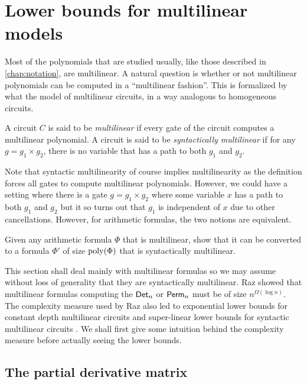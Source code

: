 \chapter{Lower bounds for multilinear models}\label{chap:multilinear}

Most of the polynomials that are studied usually, like those described in \autoref{chap:notation}, are multilinear. 
A natural question is whether or not multilinear polynomials can be computed in a ``multilinear fashion''. 
This is formalized by what the model of multilinear circuits, in a way analogous to homogeneous circuits. 

\begin{definition}
A circuit $C$ is said to be \emph{multilinear} if every gate of the circuit computes a multilinear polynomial. 
A circuit is said to be \emph{syntactically multilinear} if for any $g = g_1 \times g_2$, there is no variable that has a path to both $g_1$ and $g_2$. 
\end{definition}

Note that syntactic multilinearity of course implies multilinearity as the definition forces all gates to compute multilinear polynomials. 
However, we could have a setting where there is a gate $g = g_1 \times g_2$ where some variable $x$ has a path to both $g_1$ and $g_2$ but it so turns out that $g_1$ is independent of $x$ due to other cancellations. 
However, for arithmetic formulas, the two notions are equivalent. 

\begin{exercise}
Given any arithmetic formula $\Phi$ that is multilinear, show that it can be converted to a formula $\Phi'$ of size $\operatorname{poly}(\Phi)$ that is syntactically multilinear. 
\end{exercise}

This section shall deal mainly with multilinear formulas so we may assume without loss of generality that they are syntactically multilinear. 
Raz \cite{raz2004} showed that multilinear formulas computing the $\operatorname{\mathsf{Det}}_n$ or $\operatorname{\mathsf{Perm}}_n$ must be of size $n^{\Omega(\log n)}$. 
The complexity measure used by Raz also led to exponential lower bounds for constant depth multilinear circuits \cite{raz-yehudayoff} and super-linear lower bounds for syntactic multilinear circuits \cite{RSY08}. 
We shall first give some intuition behind the complexity measure before actually seeing the lower bounds. 

\section{The partial derivative matrix}
